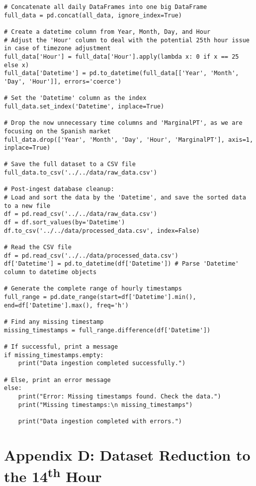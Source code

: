 \documentclass[12pt]{report} %
\begin{document}
\begin{lstlisting}
# Concatenate all daily DataFrames into one big DataFrame
full_data = pd.concat(all_data, ignore_index=True)

# Create a datetime column from Year, Month, Day, and Hour
# Adjust the 'Hour' column to deal with the potential 25th hour issue in case of timezone adjustment
full_data['Hour'] = full_data['Hour'].apply(lambda x: 0 if x == 25 else x)
full_data['Datetime'] = pd.to_datetime(full_data[['Year', 'Month', 'Day', 'Hour']], errors='coerce')

# Set the 'Datetime' column as the index
full_data.set_index('Datetime', inplace=True)

# Drop the now unnecessary time columns and 'MarginalPT', as we are focusing on the Spanish market
full_data.drop(['Year', 'Month', 'Day', 'Hour', 'MarginalPT'], axis=1, inplace=True)

# Save the full dataset to a CSV file
full_data.to_csv('../../data/raw_data.csv')

# Post-ingest database cleanup:
# Load and sort the data by the 'Datetime', and save the sorted data to a new file
df = pd.read_csv('../../data/raw_data.csv')
df = df.sort_values(by='Datetime')
df.to_csv('../../data/processed_data.csv', index=False)

# Read the CSV file
df = pd.read_csv('../../data/processed_data.csv')
df['Datetime'] = pd.to_datetime(df['Datetime']) # Parse 'Datetime' column to datetime objects

# Generate the complete range of hourly timestamps
full_range = pd.date_range(start=df['Datetime'].min(), end=df['Datetime'].max(), freq='h')

# Find any missing timestamp
missing_timestamps = full_range.difference(df['Datetime'])

# If successful, print a message
if missing_timestamps.empty:
    print("Data ingestion completed successfully.")

# Else, print an error message
else:
    print("Error: Missing timestamps found. Check the data.")
    print("Missing timestamps:\n missing_timestamps")

    print("Data ingestion completed with errors.")
\end{lstlisting}



\chapter* {Appendix D: Dataset Reduction to the 14\textsuperscript{th} Hour}
\label{app:appendix_d_dataset_reduction}
\end{document}
